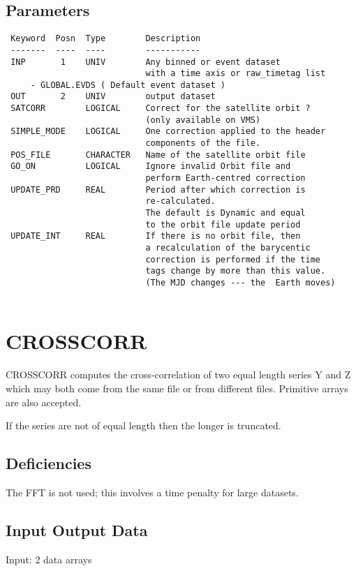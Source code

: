 \documentclass{book}
\renewcommand{\_}{{\tt\char'137}}     %
\begin{document}
\subsection{Parameters}
\begin{verbatim}
 Keyword  Posn  Type        Description
 -------  ----  ----        -----------
 INP       1    UNIV        Any binned or event dataset
                            with a time axis or raw_timetag list
     - GLOBAL.EVDS ( Default event dataset )
 OUT       2    UNIV        output dataset
 SATCORR        LOGICAL     Correct for the satellite orbit ?
                            (only available on VMS)
 SIMPLE_MODE    LOGICAL     One correction applied to the header
                            components of the file.
 POS_FILE       CHARACTER   Name of the satellite orbit file
 GO_ON          LOGICAL     Ignore invalid Orbit file and
                            perform Earth-centred correction
 UPDATE_PRD     REAL        Period after which correction is
                            re-calculated.
                            The default is Dynamic and equal
                            to the orbit file update period
 UPDATE_INT     REAL        If there is no orbit file, then
                            a recalculation of the barycentic
                            correction is performed if the time
                            tags change by more than this value.
                            (The MJD changes --- the  Earth moves)
 
\end{verbatim}\section{CROSSCORR}
CROSSCORR computes the cross-correlation of two equal length series
Y and Z which may both come from the same file or from different
files. Primitive arrays are also accepted.
 
If the series are not of equal length then the longer is
truncated.
 
\subsection{Deficiencies}
The FFT is not used; this involves a time penalty for large datasets.
 
\subsection{Input Output Data}
Input: 2 data arrays
 
\end{document}
